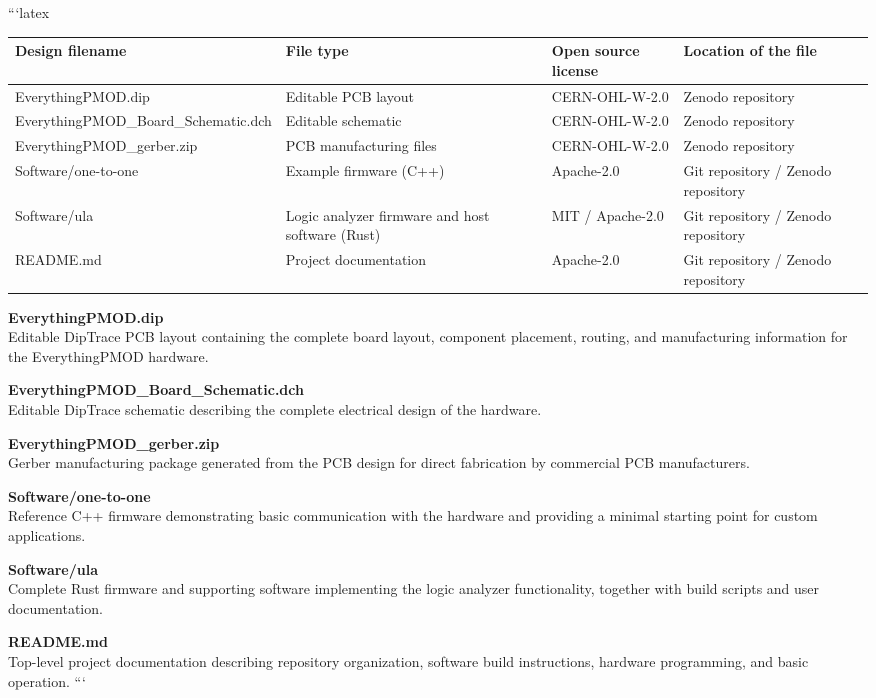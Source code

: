 ```latex
\begin{tabu} to \linewidth {|X|X|X[1.2,1]|X[1.6,1]|}
\hline
\textbf{Design filename} & \textbf{File type} & \textbf{Open source license} & \textbf{Location of the file} \\\hline

EverythingPMOD.dip &
Editable PCB layout &
CERN-OHL-W-2.0 &
Zenodo repository \\\hline

EverythingPMOD_Board_Schematic.dch &
Editable schematic &
CERN-OHL-W-2.0 &
Zenodo repository \\\hline

EverythingPMOD_gerber.zip &
PCB manufacturing files &
CERN-OHL-W-2.0 &
Zenodo repository \\\hline

Software/one-to-one &
Example firmware (C++) &
Apache-2.0 &
Git repository / Zenodo repository \\\hline

Software/ula &
Logic analyzer firmware and host software (Rust) &
MIT / Apache-2.0 &
Git repository / Zenodo repository \\\hline

README.md &
Project documentation &
Apache-2.0 &
Git repository / Zenodo repository \\\hline

\end{tabu}

\vskip 0.3cm

\noindent
\textbf{EverythingPMOD.dip}\\
Editable DipTrace PCB layout containing the complete board layout, component placement, routing, and manufacturing information for the EverythingPMOD hardware.

\vskip 0.2cm

\noindent
\textbf{EverythingPMOD\_Board\_Schematic.dch}\\
Editable DipTrace schematic describing the complete electrical design of the hardware.

\vskip 0.2cm

\noindent
\textbf{EverythingPMOD\_gerber.zip}\\
Gerber manufacturing package generated from the PCB design for direct fabrication by commercial PCB manufacturers.

\vskip 0.2cm

\noindent
\textbf{Software/one-to-one}\\
Reference C++ firmware demonstrating basic communication with the hardware and providing a minimal starting point for custom applications.

\vskip 0.2cm

\noindent
\textbf{Software/ula}\\
Complete Rust firmware and supporting software implementing the logic analyzer functionality, together with build scripts and user documentation.

\vskip 0.2cm

\noindent
\textbf{README.md}\\
Top-level project documentation describing repository organization, software build instructions, hardware programming, and basic operation.
```

